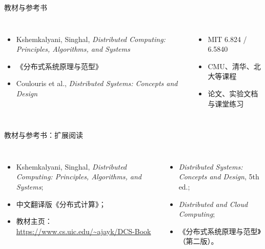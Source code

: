 \documentclass[UTF8,fontset=none,aspectratio=169,10pt]{beamer}
\begin{document}
\begin{frame}{教材与参考书}
\begin{columns}[T,onlytextwidth]
\begin{itemize}\item Kshemkalyani, Singhal, \textit{Distributed Computing: Principles, Algorithms, and Systems}\item 《分布式系统原理与范型》\item Coulouris et al., \textit{Distributed Systems: Concepts and Design}\end{itemize}
\begin{itemize}\item MIT 6.824 / 6.5840\item CMU、清华、北大等课程\item 论文、实验文档与课堂练习\end{itemize}
\end{columns}
\end{frame}

\begin{frame}{教材与参考书：扩展阅读}
\begin{columns}[T,onlytextwidth]
\begin{itemize}
  \item Kshemkalyani, Singhal, \textit{Distributed Computing: Principles, Algorithms, and Systems};
  \item 中文翻译版《分布式计算》；
  \item 教材主页：\url{https://www.cs.uic.edu/~ajayk/DCS-Book}
\end{itemize}
\begin{itemize}
  \item \textit{Distributed Systems: Concepts and Design}, 5th ed.;
  \item \textit{Distributed and Cloud Computing};
  \item 《分布式系统原理与范型》（第二版）。
\end{itemize}
\end{columns}
\end{frame}
\end{document}
